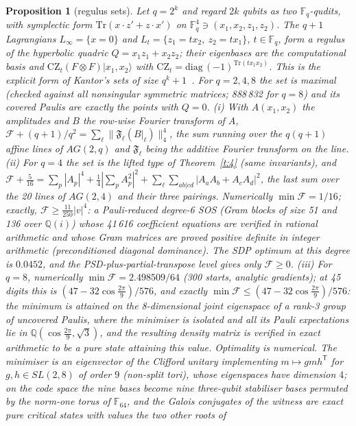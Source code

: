 \documentclass[11pt]{article}
\newtheorem{proposition}[theorem]{Proposition}
\theoremstyle{remark}\newtheorem*{remark}{Remark}
\newcommand{\F}{\mathcal{F}}
\begin{document}
\begin{proposition}[regulus sets]\label{p:reg}
Let $q=2^k$ and regard $2k$ qubits as two $\mathbb{F}_q$-qudits, with symplectic form $\mathrm{Tr}(x\cdot z'+z\cdot x')$ on
$\mathbb{F}_q^4\ni(x_1,x_2,z_1,z_2)$. The $q+1$ Lagrangians $L_\infty=\{x=0\}$ and $L_t=\{z_1=tx_2,\ z_2=tx_1\}$, $t\in\mathbb{F}_q$,
form a regulus of the hyperbolic quadric $Q=x_1z_1+x_2z_2$; their eigenbases are the computational basis and
$\mathrm{CZ}_t(F\otimes F)|x_1,x_2\rangle$ with $\mathrm{CZ}_t=\mathrm{diag}\,(-1)^{\mathrm{Tr}(tx_1x_2)}$. This is the explicit form of
Kantor's sets of size $q^k+1$~\cite{kantor}. For $q=2,4,8$ the set is maximal (checked against all nonsingular symmetric matrices;
888\,832 for $q=8$) and its covered Paulis are exactly the points with $Q=0$.
(i) With $A(x_1,x_2)$ the amplitudes and $B$ the row-wise Fourier transform of $A$,
$\F+(q+1)/q^2=\sum_{\ell}\|\mathfrak{F}_\ell(B|_\ell)\|_4^4$, the sum running over the $q(q+1)$ affine lines of $AG(2,q)$ and
$\mathfrak{F}_\ell$ being the additive Fourier transform on the line.
(ii) For $q=4$ the set is the lifted type of Theorem~\ref{t:4} (same invariants), and
$\F+\tfrac5{16}=\sum_p|A_p|^4+\tfrac14|\sum_pA_p^2|^2+\sum_{\ell}\sum_{ab|cd}|A_aA_b+A_cA_d|^2$, the last sum over the 20 lines of
$AG(2,4)$ and their three pairings. Numerically $\min\F=1/16$; exactly, $\F\ge\tfrac{11}{250}|v|^4$: a Pauli-reduced
degree-6 SOS (Gram blocks of size 51 and 136 over $\mathbb{Q}(i)$) whose 41\,616 coefficient equations are verified in rational
arithmetic and whose Gram matrices are proved positive definite in integer arithmetic (preconditioned diagonal dominance). The SDP
optimum at this degree is $0.0452$, and the PSD-plus-partial-transpose level gives only $\F\ge0$.
(iii) For $q=8$, numerically $\min\F=2.498509/64$ (300 starts, analytic gradients); at 45 digits this is
$(47-32\cos\frac{2\pi}9)/576$, and exactly $\min\F\le(47-32\cos\frac{2\pi}9)/576$: the minimum is attained on the
8-dimensional joint eigenspace of a rank-3 group of uncovered Paulis, where the minimiser is isolated and all its Pauli
expectations lie in $\mathbb{Q}(\cos\frac{2\pi}9,\sqrt3)$, and the resulting density matrix is verified in exact arithmetic to
be a pure state attaining this value. Optimality is numerical. The minimiser is an eigenvector of the Clifford
unitary implementing $m\mapsto gmh^{\mathsf T}$ for $g,h\in SL(2,8)$ of order $9$ (non-split tori), whose eigenspaces have
dimension $4$; on the code space the nine bases become nine three-qubit stabiliser bases permuted by the norm-one torus of
$\mathbb{F}_{64}$, and the Galois conjugates of the witness are exact pure critical states with values the two other roots of

\end{proposition}
\end{document}
